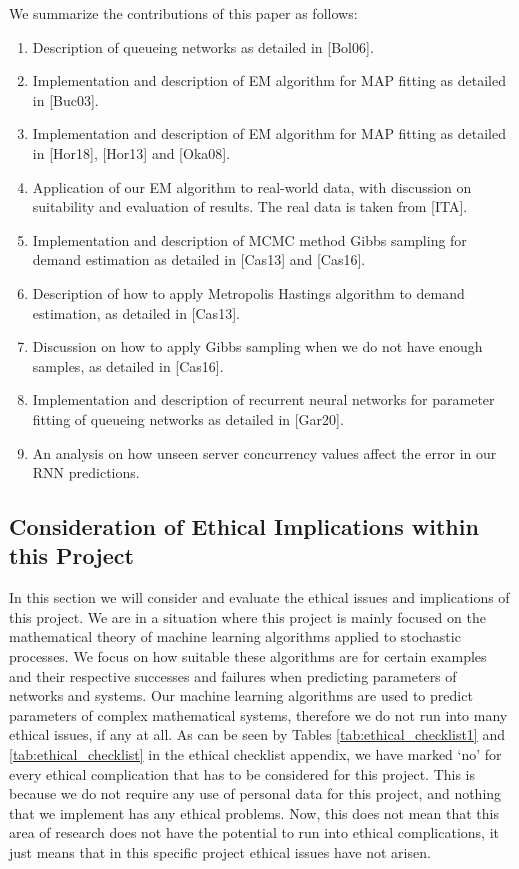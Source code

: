 \documentclass[a4paper,11pt,titlepage]{article}
\begin{document}
We summarize the contributions of this paper as follows: 

\begin{enumerate}
    \item Description of queueing networks as detailed in [Bol06].
    \item Implementation and description of EM algorithm for MAP fitting as detailed in [Buc03].
    \item Implementation and description of EM algorithm for MAP fitting as detailed in [Hor18], [Hor13] and [Oka08].
    \item Application of our EM algorithm to real-world data, with discussion on suitability and evaluation of results. The real data is taken from [ITA].
    \item Implementation and description of MCMC method Gibbs sampling for demand estimation as detailed in [Cas13] and [Cas16].
    \item Description of how to apply Metropolis Hastings algorithm to demand estimation, as detailed in [Cas13]. 
    \item Discussion on how to apply Gibbs sampling when we do not have enough samples, as detailed in [Cas16]. 
    \item Implementation and description of recurrent neural networks for parameter fitting of queueing networks as detailed in [Gar20].
    \item An analysis on how unseen server concurrency values affect the error in our RNN predictions. 
\end{enumerate}

\subsection{Consideration of Ethical Implications within this Project}

In this section we will consider and evaluate the ethical issues and implications of this project. We are in a situation where this project is mainly focused on the mathematical theory of machine learning algorithms applied to stochastic processes. We focus on how suitable these algorithms are for certain examples and their respective successes and failures when predicting parameters of networks and systems. Our machine learning algorithms are used to predict parameters of complex mathematical systems, therefore we do not run into many ethical issues, if any at all. As can be seen by Tables \ref{tab:ethical_checklist1} and \ref{tab:ethical_checklist} in the ethical checklist appendix, we have marked `no' for every ethical complication that has to be considered for this project. This is because we do not require any use of personal data for this project, and nothing that we implement has any ethical problems. Now, this does not mean that this area of research does not have the potential to run into ethical complications, it just means that in this specific project ethical issues have not arisen. \\
\end{document}
